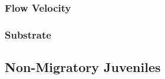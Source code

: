 \documentclass[
]{book}
\begin{document}
\hypertarget{flow-velocity-9}{%
\subsubsection{Flow Velocity}\label{flow-velocity-9}}

\hypertarget{substrate-9}{%
\subsubsection{Substrate}\label{substrate-9}}

\hypertarget{non-migratory-juveniles-3}{%
\subsection{Non-Migratory Juveniles}\label{non-migratory-juveniles-3}}
\end{document}
